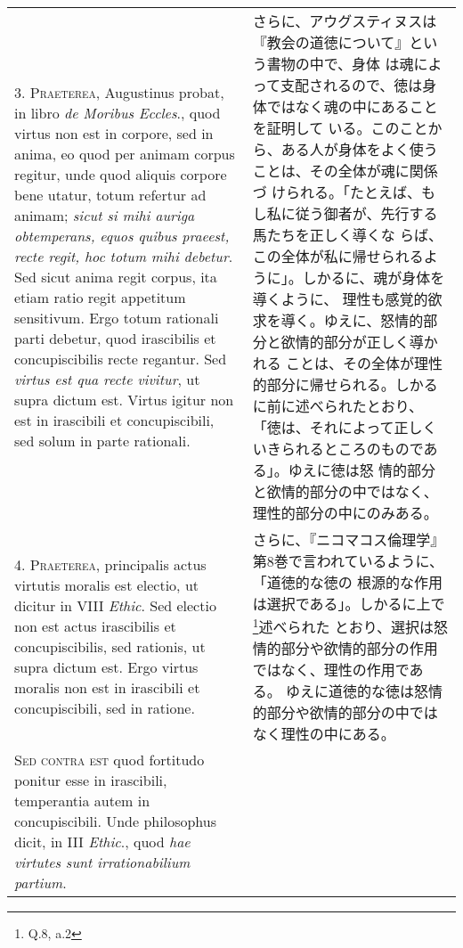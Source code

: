 \documentclass[10pt]{jsarticle}
\begin{document}
\begin{longtable}{p{21em}p{21em}}
\\



3. {\scshape Praeterea}, Augustinus probat, in libro {\itshape de
Moribus Eccles}., quod virtus non est in corpore, sed in anima, eo
quod per animam corpus regitur, unde quod aliquis corpore bene utatur,
totum refertur ad animam; {\itshape sicut si mihi auriga obtemperans,
equos quibus praeest, recte regit, hoc totum mihi debetur}. Sed sicut
anima regit corpus, ita etiam ratio regit appetitum sensitivum. Ergo
totum rationali parti debetur, quod irascibilis et concupiscibilis
recte regantur. Sed {\itshape virtus est qua recte vivitur}, ut supra
dictum est. Virtus igitur non est in irascibili et concupiscibili, sed
solum in parte rationali.

&

さらに、アウグスティヌスは『教会の道徳について』という書物の中で、身体
は魂によって支配されるので、徳は身体ではなく魂の中にあることを証明して
いる。このことから、ある人が身体をよく使うことは、その全体が魂に関係づ
けられる。「たとえば、もし私に従う御者が、先行する馬たちを正しく導くな
らば、この全体が私に帰せられるように」。しかるに、魂が身体を導くように、
理性も感覚的欲求を導く。ゆえに、怒情的部分と欲情的部分が正しく導かれる
ことは、その全体が理性的部分に帰せられる。しかるに前に述べられたとおり、
「徳は、それによって正しくいきられるところのものである」。ゆえに徳は怒
情的部分と欲情的部分の中ではなく、理性的部分の中にのみある。

\\



4. {\scshape Praeterea}, principalis actus virtutis moralis est
electio, ut dicitur in VIII {\itshape Ethic}. Sed electio non est
actus irascibilis et concupiscibilis, sed rationis, ut supra dictum
est. Ergo virtus moralis non est in irascibili et concupiscibili, sed
in ratione.

&

さらに、『ニコマコス倫理学』第8巻で言われているように、「道徳的な徳の
根源的な作用は選択である」。しかるに上で\footnote{Q.8, a.2}述べられた
とおり、選択は怒情的部分や欲情的部分の作用ではなく、理性の作用である。
ゆえに道徳的な徳は怒情的部分や欲情的部分の中ではなく理性の中にある。

\\



{\scshape Sed contra est} quod fortitudo ponitur esse in irascibili,
temperantia autem in concupiscibili. Unde philosophus dicit, in III
{\itshape Ethic}., quod {\itshape hae virtutes sunt irrationabilium
partium}.


\end{longtable}
\end{document}
